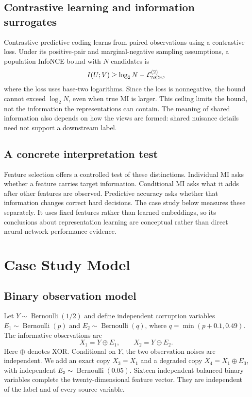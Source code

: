 \documentclass[journal,11pt]{IEEEtran}
\begin{document}
\subsection{Contrastive learning and information surrogates}
Contrastive predictive coding \cite{cpc} learns from paired observations using a contrastive loss. Under its positive-pair and marginal-negative sampling assumptions, a population InfoNCE bound with $N$ candidates is
\begin{equation}
I(U;V)\geq\log_2N-\mathcal L_{\rm NCE}^{(2)},
\end{equation}
where the loss uses base-two logarithms. Since the loss is nonnegative, the bound cannot exceed $\log_2N$, even when true MI is larger. This ceiling limits the bound, not the information the representations can contain. The meaning of shared information also depends on how the views are formed: shared nuisance details need not support a downstream label.

\subsection{A concrete interpretation test}
Feature selection offers a controlled test of these distinctions. Individual MI asks whether a feature carries target information. Conditional MI asks what it adds after other features are observed. Predictive accuracy asks whether that information changes correct hard decisions. The case study below measures these separately. It uses fixed features rather than learned embeddings, so its conclusions about representation learning are conceptual rather than direct neural-network performance evidence.

\section{Case Study Model}
\subsection{Binary observation model}
Let $Y\sim\operatorname{Bernoulli}(1/2)$ and define independent corruption variables $E_1\sim\operatorname{Bernoulli}(p)$ and $E_2\sim\operatorname{Bernoulli}(q)$, where $q=\min(p+0.1,0.49)$. The informative observations are
\begin{equation}
X_1=Y\oplus E_1,\qquad X_2=Y\oplus E_2.
\end{equation}
Here $\oplus$ denotes XOR. Conditional on $Y$, the two observation noises are independent. We add an exact copy $X_3=X_1$ and a degraded copy $X_4=X_1\oplus E_3$, with independent $E_3\sim\operatorname{Bernoulli}(0.05)$. Sixteen independent balanced binary variables complete the twenty-dimensional feature vector. They are independent of the label and of every source variable.
\end{document}
